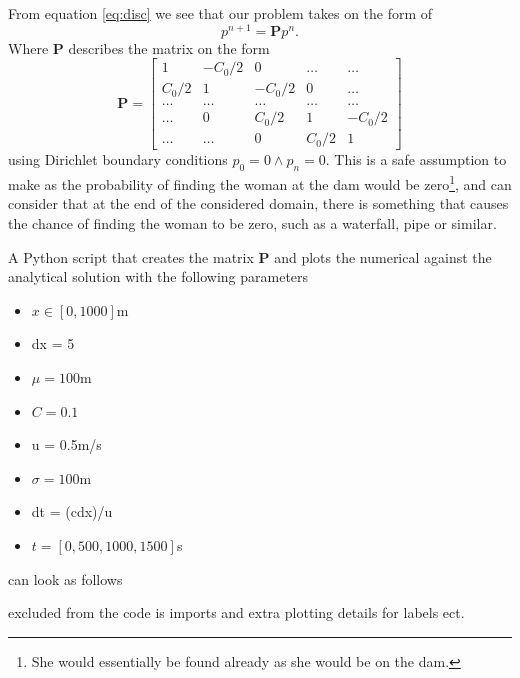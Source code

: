 \documentclass[10pt, a4paper]{amsart}
\begin{document}
From equation \ref{eq:disc} we see that our problem takes on the form of 
\begin{equation}\label{eq:FTCS}
	p^{n+1} = \mathbf{P}p^n.
\end{equation}
Where $\mathbf{P}$ describes the matrix on the form 
\begin{equation}\label{mat:FTCS}
	\mathbf{P} = 
	\begin{bmatrix}
		1 & -C_0/2 & 0 & \dots & \dots\\
		C_0/2 & 1& -C_0/2 & 0 & \dots \\
		\dots & \dots & \dots & \dots &  \dots \\
		\dots & 0 & C_0/2 & 1 &  -C_0/2 \\
		\dots &  \dots & 0 & C_0/2 & 1
	\end{bmatrix}
\end{equation}
using Dirichlet boundary conditions $p_0 = 0 \land p_n = 0$. This is a safe assumption to make as the probability of finding the woman at the dam would be zero\footnote{She would essentially be found already as she would be on the dam.}, and can consider that at the end of the considered domain, there is something that causes the chance of finding the woman to be zero, such as a waterfall, pipe or similar. 

A Python script that creates the matrix $\mathbf{P}$ and plots the numerical against the analytical solution with the following parameters
\begin{itemize}
	\item $x\in [0,1000]$m
	\item dx = 5
	\item $\mu = 100$m
	\item $C = 0.1$
	\item u = 0.5m/s
	\item $\sigma = 100$m
	\item dt = (cdx)/u
	\item $t = [0,500,1000,1500]$s
\end{itemize}
can look as follows 

excluded from the code is imports and extra plotting details for labels ect. 
\end{document}
